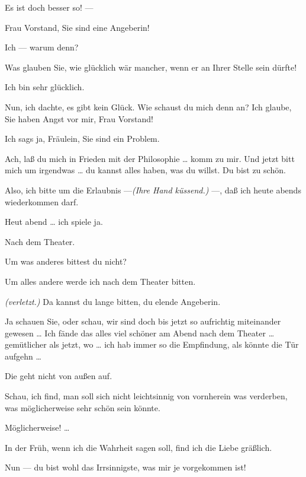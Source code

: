 \documentclass[
	final,
	a4paper,
	ngerman,
	mpinclude = true, %
	twoside = true,
	open = right,
	cleardoublepage = plain,
	DIV = 13,
	BCOR = 1cm,
	titlepage = firstiscover,
	]{scrbook}
\newcommand{\direction}[1]{\textit{(#1)}}
\newcommand{\thecharacter}[1]{\textup{\textsc{#1}}\xspace}
\newcommand{\theschauspielerin}{\thecharacter{Schauspielerin}}
\newcommand{\thegraf}{\thecharacter{Entrepeneurin}}
\newcommand{\character}[1]{\item[#1:]}
\newcommand{\schauspielerin}{\character{\theschauspielerin}}
\newcommand{\entrepeneurin}{\character{\thegraf}}
\begin{document}
\begin{play}
	\entrepeneurin
	Es ist doch besser so! ---

	\schauspielerin
	Frau Vorstand, Sie sind eine Angeberin!

	\entrepeneurin
	Ich --- warum denn?

	\schauspielerin
	Was glauben Sie, wie glücklich wär mancher, wenn er an Ihrer Stelle sein dürfte!

	\entrepeneurin
	Ich bin sehr glücklich.

	\schauspielerin
	Nun, ich dachte, es gibt kein Glück. Wie schaust du mich denn an? Ich glaube, Sie haben Angst vor mir, Frau Vorstand!

	\entrepeneurin
	Ich sags ja, Fräulein, Sie sind ein Problem.

	\schauspielerin
	Ach, laß du mich in Frieden mit der Philosophie \ldots{} komm zu mir. Und jetzt bitt mich um irgendwas \ldots{} du kannst alles haben, was du willst. Du bist zu schön.

	\entrepeneurin
	Also, ich bitte um die Erlaubnis ---\direction{Ihre Hand küssend.} ---, daß ich heute abends wiederkommen darf.

	\schauspielerin
	Heut abend \ldots{} ich spiele ja.

	\entrepeneurin
	Nach dem Theater.

	\schauspielerin
	Um was anderes bittest du nicht?

	\entrepeneurin
	Um alles andere werde ich nach dem Theater bitten.

	\schauspielerin
	\direction{verletzt.} Da kannst du lange bitten, du elende Angeberin.

	\entrepeneurin
	Ja schauen Sie, oder schau, wir sind doch bis jetzt so aufrichtig miteinander gewesen \ldots{} Ich fände das alles viel schöner am Abend nach dem Theater \ldots{} gemütlicher als jetzt, wo \ldots{} ich hab immer so die Empfindung, als könnte die Tür aufgehn \ldots{}

	\schauspielerin
	Die geht nicht von außen auf.

	\entrepeneurin
	Schau, ich find, man soll sich nicht leichtsinnig von vornherein was verderben, was möglicherweise sehr schön sein könnte.

	\schauspielerin
	Möglicherweise! \ldots{}

	\entrepeneurin
	In der Früh, wenn ich die Wahrheit sagen soll, find ich die Liebe gräßlich.

	\schauspielerin
	Nun --- du bist wohl das Irrsinnigste, was mir je vorgekommen ist!


\end{play}
\end{document}
